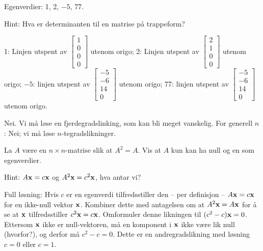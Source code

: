 \begin{losning}

\begin{punkt}
Egenverdier: 1, 2, $-5$, 77. 

\noindent
Hint: Hva er determinanten til en matrise på trappeform?
\end{punkt}

\begin{punkt}

1: Linjen utspent av $\begin{bmatrix}
1\\
0\\
0\\
0
\end{bmatrix}$ utenom origo; 2: Linjen utspent av $\begin{bmatrix}
2\\
1\\
0\\
0
\end{bmatrix}$ utenom origo; $-5$: linjen utspent av $\begin{bmatrix}
-5\\
-6\\
14\\
0
\end{bmatrix}$ utenom origo; 77: linjen utspent av $\begin{bmatrix}
-5\\
-6\\
14\\
0
\end{bmatrix}$ utenom origo.

\end{punkt}

\begin{punkt}
Nei. Vi må løse en fjerdegradslinking, som kan bli meget vanskelig. For generell $n$: Nei; vi må løse $n$-tegradslikninger.
\end{punkt}

\end{losning}



\begin{oppgave}
La $A$ være en $n\times n$-matrise slik at $A^2=A$. Vis at $A$ kun kan ha null og en som egenverdier.

\noindent
Hint: $A\mathbf{x}=c\mathbf{x}$ og $A^2\mathbf{x}=c^2\mathbf{x}$, hva antar vi?
\end{oppgave}

\begin{losning}
Full løsning: Hvis $c$ er en egenverdi tilfredsstiller den -- per definisjon -- $A\mathbf{x}=c\mathbf{x}$ for en ikke-null vektor $\mathbf{x}$. Kombiner dette med antagelsen om at $A^2\mathbf{x}=A\mathbf{x}$ for å se at $\mathbf{x}$ tilfredsstiller $c^2\mathbf{x}=c\mathbf{x}$. Omformuler denne likningen til $(c^2-c)\mathbf{x}=0$. Ettersom $\mathbf{x}$ ikke er null-vektoren, må en komponent i $\mathbf{x}$ ikke være lik null (hvorfor?), og derfor må $c^2-c=0$. Dette er en andregradslikning med løsning $c=0$ eller $c=1$.
\end{losning}

